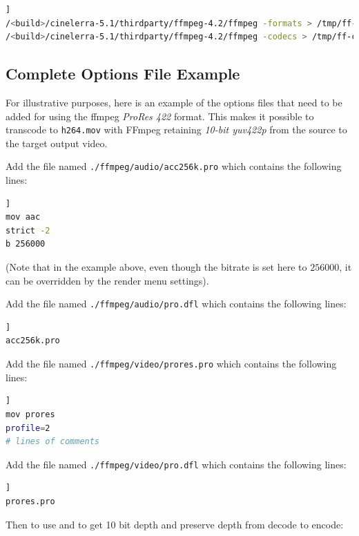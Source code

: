 \begin{lstlisting}[language=bash,numbers=none]]
/<build>/cinelerra-5.1/thirdparty/ffmpeg-4.2/ffmpeg -formats > /tmp/ff-formats.txt
/<build>/cinelerra-5.1/thirdparty/ffmpeg-4.2/ffmpeg -codecs > /tmp/ff-codecs.txt
\end{lstlisting}

\subsection{Complete Options File Example}%
\label{sub:complete_options_file_example}

For illustrative purposes, here is an example of the options files that need to be added for using the ffmpeg \textit{ProRes 422} format. This makes it possible to transcode to \texttt{h264.mov} with FFmpeg retaining \textit{10-bit yuv422p} from the source to the target output video.

Add the file named  \texttt{./ffmpeg/audio/acc256k.pro} which contains the following lines:

\begin{lstlisting}[language=bash,numbers=none]]
mov aac
strict -2
b 256000
\end{lstlisting}

(Note that in the example above, even though the bitrate is set here to $256000$, it can be 	overridden by the render menu settings).

Add the file named \texttt{./ffmpeg/audio/pro.dfl} which contains the following lines:

\begin{lstlisting}[language=bash,numbers=none]]
acc256k.pro
\end{lstlisting}

Add the file named \texttt{./ffmpeg/video/prores.pro} which contains the following lines:

\begin{lstlisting}[language=bash,numbers=none]]
mov prores
profile=2
# lines of comments
\end{lstlisting}

Add the file named \texttt{./ffmpeg/video/pro.dfl} which contains the following lines:

\begin{lstlisting}[language=bash,numbers=none]]
prores.pro
\end{lstlisting}

Then to use and to get 10 bit depth and preserve depth from decode to encode:


